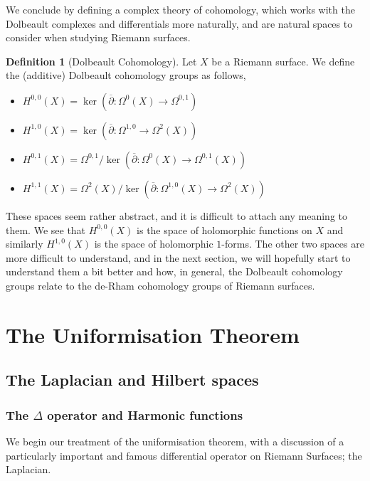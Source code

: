 \documentclass[11pt]{report}
\theoremstyle{definition}
\newtheorem{defn}[thm]{Definition}
\begin{document}
We conclude by defining a complex theory of cohomology, which works with the Dolbeault complexes and differentials more naturally, and are natural spaces to consider when studying Riemann surfaces.
\begin{defn}[Dolbeault Cohomology]
  Let $X$ be a Riemann surface. We define the (additive) Dolbeault cohomology groups as follows,
  \begin{itemize}
    \item $H^{0,0}(X) = \ker(\overline{\partial}:\Omega^0(X)\rightarrow \Omega^{0,1})$
    \item $H^{1,0}(X) = \ker(\overline{\partial}:\Omega^{1,0}\rightarrow \Omega^2(X))$
    \item $H^{0,1}(X) = \Omega^{0,1}/\ker(\overline{\partial}:\Omega^0(X)\rightarrow \Omega^{0,1}(X))$
    \item $H^{1,1}(X) = \Omega^2(X)/\ker(\overline{\partial}:\Omega^{1,0}(X) \rightarrow \Omega^2(X))$
  \end{itemize}
\end{defn}
These spaces seem rather abstract, and it is difficult to attach any meaning to them. We see that $H^{0,0}(X)$ is the space of holomorphic functions on $X$ and similarly $H^{1,0}(X)$ is the space of holomorphic $1$-forms. The other two spaces are more difficult to understand, and in the next section, we will hopefully start to understand them a bit better and how, in general, the Dolbeault cohomology groups relate to the de-Rham cohomology groups of Riemann surfaces.
\newpage
\chapter{The Uniformisation Theorem}
\section{The Laplacian and Hilbert spaces}
\subsection{The $\Delta$ operator and Harmonic functions}
We begin our treatment of the uniformisation theorem, with a discussion of a particularly important and famous differential operator on Riemann Surfaces; the Laplacian.
\end{document}
